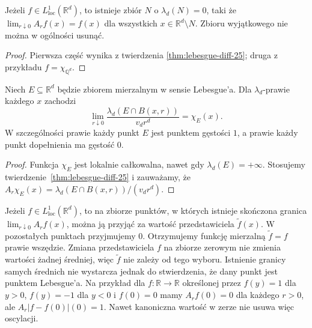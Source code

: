 \begin{wniosek}
\label{cor:diff-basis-25}
Jeżeli $f\in L^1_{\mathrm{loc}}(\mathbb R^d)$,
to istnieje zbiór $N$ o $\lambda_d(N)=0$, taki że
$\lim_{r\downarrow0}A_rf(x)=f(x)$ dla wszystkich
$x\in\mathbb R^d\setminus N$. Zbioru wyjątkowego
nie można w ogólności usunąć.
\end{wniosek}
\begin{proof}
Pierwsza część wynika z twierdzenia
\ref{thm:lebesgue-diff-25}; druga z przykładu
$f=\chi_{\mathbb Q^d}$.
\end{proof}

\begin{wniosek}
\label{cor:lebesgue-density-25}
Niech $E\subseteq\mathbb R^d$ będzie zbiorem mierzalnym
w sensie Lebesgue'a. Dla $\lambda_d$-prawie każdego $x$ zachodzi
\[
 \lim_{r\downarrow0}\frac{\lambda_d(E\cap B(x,r))}{v_dr^d}
 =\chi_E(x).
\]
W szczególności prawie każdy punkt $E$ jest punktem gęstości
$1$, a prawie każdy punkt dopełnienia ma gęstość $0$.
\end{wniosek}
\begin{proof}
Funkcja $\chi_E$ jest lokalnie całkowalna, nawet gdy
$\lambda_d(E)=+\infty$. Stosujemy
twierdzenie~\ref{thm:lebesgue-diff-25} i zauważamy, że
$A_r\chi_E(x)=\lambda_d(E\cap B(x,r))/(v_dr^d)$.
\end{proof}

\begin{przyklad}
Jeżeli $f\in L^1_{\mathrm{loc}}(\mathbb R^d)$, to
na zbiorze punktów, w których istnieje skończona granica
$\lim_{r\downarrow0}A_rf(x)$, można ją przyjąć za
wartość przedstawiciela $\widetilde f(x)$. W pozostałych
punktach przyjmujemy $0$. Otrzymujemy funkcję mierzalną
$\widetilde f=f$ prawie wszędzie. Zmiana przedstawiciela
$f$ na zbiorze zerowym nie zmienia wartości żadnej średniej,
więc $\widetilde f$ nie zależy od tego wyboru.
Istnienie granicy samych średnich nie wystarcza jednak
do stwierdzenia, że dany punkt jest punktem Lebesgue'a.
Na przykład dla $f:\mathbb R\to\mathbb R$ określonej przez
$f(y)=1$ dla $y>0$, $f(y)=-1$ dla $y<0$ i $f(0)=0$
mamy $A_rf(0)=0$ dla każdego $r>0$, ale
$A_r|f-f(0)|(0)=1$. Nawet kanoniczna wartość w zerze
nie usuwa więc oscylacji.
\end{przyklad}

